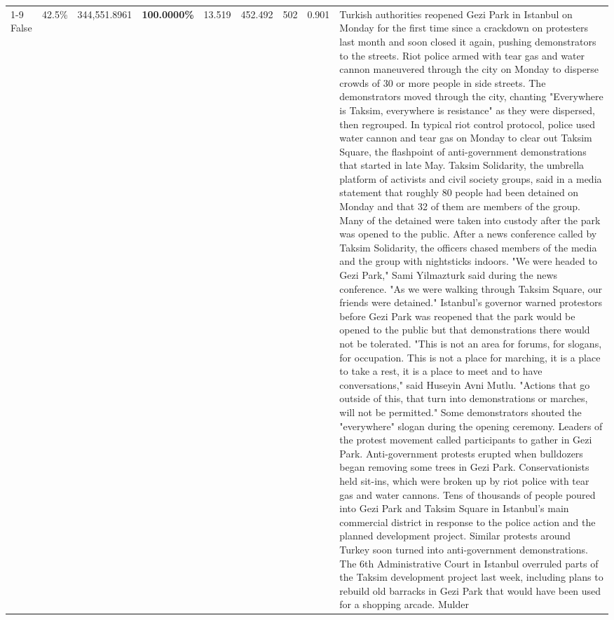\begin{table}[H]
\begin{tabular}{lllrlllll}
\cline{1-9}
False & 42.5\% & 344,551.8961 & \bfseries \color{red} 100.0000\% & 13.519 & 452.492 & 502 & 0.901 & Turkish authorities reopened Gezi Park in Istanbul on Monday for the first time since a crackdown on protesters last month and soon closed it again, pushing demonstrators to the streets. Riot police armed with tear gas and water cannon maneuvered through the city on Monday to disperse crowds of 30 or more people in side streets. The demonstrators moved through the city, chanting "Everywhere is Taksim, everywhere is resistance" as they were dispersed, then regrouped. In typical riot control protocol, police used water cannon and tear gas on Monday to clear out Taksim Square, the flashpoint of anti-government demonstrations that started in late May. Taksim Solidarity, the umbrella platform of activists and civil society groups, said in a media statement that roughly 80 people had been detained on Monday and that 32 of them are members of the group. Many of the detained were taken into custody after the park was opened to the public. After a news conference called by Taksim Solidarity, the officers chased members of the media and the group with nightsticks indoors. "We were headed to Gezi Park," Sami Yilmazturk said during the news conference. "As we were walking through Taksim Square, our friends were detained." Istanbul's governor warned protestors before Gezi Park was reopened that the park would be opened to the public but that demonstrations there would not be tolerated. "This is not an area for forums, for slogans, for occupation. This is not a place for marching, it is a place to take a rest, it is a place to meet and to have conversations," said Huseyin Avni Mutlu. "Actions that go outside of this, that turn into demonstrations or marches, will not be permitted." Some demonstrators shouted the "everywhere" slogan during the opening ceremony. Leaders of the protest movement called participants to gather in Gezi Park. Anti-government protests erupted when bulldozers began removing some trees in Gezi Park. Conservationists held sit-ins, which were broken up by riot police with tear gas and water cannons. Tens of thousands of people poured into Gezi Park and Taksim Square in Istanbul's main commercial district in response to the police action and the planned development project. Similar protests around Turkey soon turned into anti-government demonstrations. The 6th Administrative Court in Istanbul overruled parts of the Taksim development project last week, including plans to rebuild old barracks in Gezi Park that would have been used for a shopping arcade. Mulder \\

\end{tabular}
\end{table}
